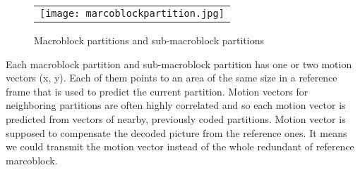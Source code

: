 \documentclass[../main.tex]{subfiles}
\begin{document}
\begin{figure} [ht]
   \begin{center}
   \begin{tabular}{c} %
   \texttt{[image: marcoblockpartition.jpg]}
   \end{tabular}
   \end{center}
   \caption[mbpart] 
   { \label{fig:mbpart} 
Macroblock partitions and sub-macroblock partitions \cite{richardson2004h} }
   \end{figure}     %
   
Each macroblock partition and sub-macroblock partition has one or two motion vectors (x, y). Each of them points to an area of the same size in a reference frame that is used to predict the current partition. Motion vectors for neighboring partitions are often highly correlated and so each motion vector is predicted from vectors of nearby, previously coded partitions. Motion vector is supposed to compensate the decoded picture from the reference ones. It means we could transmit the motion vector instead of the whole redundant of reference marcoblock.
\end{document}
